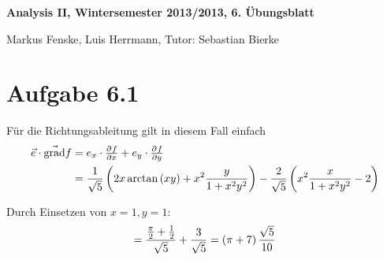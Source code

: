 \documentclass[a4paper,german,12pt,smallheadings]{scrartcl}
\begin{document}
\begin{center}
\bfseries %
\sffamily %
\vspace{-40pt}
Analysis II, Wintersemester 2013/2013, 6. Übungsblatt

Markus Fenske, Luis Herrmann, Tutor: Sebastian Bierke
\vspace{-10pt}
\end{center}
\allowdisplaybreaks %
\section*{Aufgabe 6.1}
Für die Richtungsableitung gilt in diesem Fall einfach
\begin{align*}
  \vec{e} \cdot \vec{\operatorname{grad}} f &= e_x \cdot \pd{f}{x} + e_y \cdot \pd{f}{y} \\
                                            &= \frac{1}{\sqrt{5}} \del{2x \arctan\del{xy} + x^2 \frac{y}{1+x^2y^2}}
                                               - \frac{2}{\sqrt{5}} \del{x^2 \frac{x}{1+x^2y^2} - 2}
\end{align*}

Durch Einsetzen von $x=1, y=1$:
\begin{equation*}
  = \frac{\frac{\pi}{2} + \frac{1}{2}}{\sqrt{5}} + \frac{3}{\sqrt{5}} = \del{\pi+7}\frac{\sqrt{5}}{10}
\end{equation*}
\end{document}
